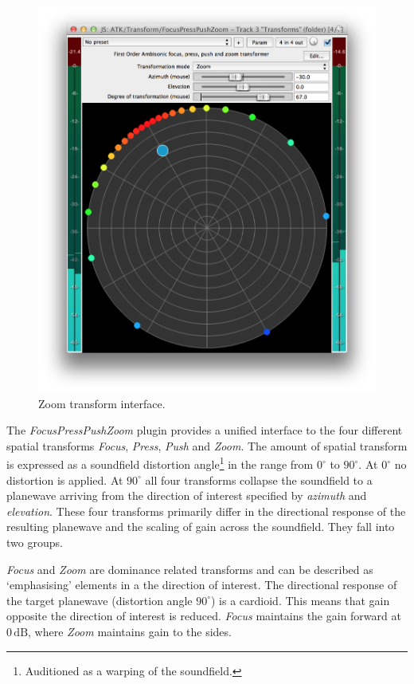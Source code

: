 \documentclass{article}
\begin{document}
\begin{figure}[h]
\captionsetup{aboveskip=-6pt}
\centering
\includegraphics[width=0.8\columnwidth]{figures/zoomTransform.png}
\caption{Zoom transform interface.\label{fig:zoomTransform}}
\end{figure}

The \emph{FocusPressPushZoom} plugin provides a unified interface to the four different spatial transforms \emph{Focus}, \emph{Press}, \emph{Push} and \emph{Zoom}.
The amount of spatial transform is expressed as a soundfield distortion angle\footnote{Auditioned as a warping of the soundfield.} in the range from $0^\circ$ to $90^\circ$.
At $0^\circ$ no distortion is applied. At $90^\circ$ all four transforms collapse the soundfield to a planewave arriving from the direction of interest specified by \emph{azimuth} and \emph{elevation}. These four transforms primarily differ in the directional response of the resulting planewave and the scaling of gain across the soundfield. They fall into two groups.

\emph{Focus} and \emph{Zoom} are dominance related transforms and can be described as `emphasising' elements in a the direction of interest. The directional response of the target planewave (distortion angle $90^\circ$) is a cardioid. This means that gain opposite the direction of interest is reduced. \emph{Focus} maintains the gain forward at $0\,\mathrm{dB}$, where \emph{Zoom} maintains gain to the sides.
\end{document}
